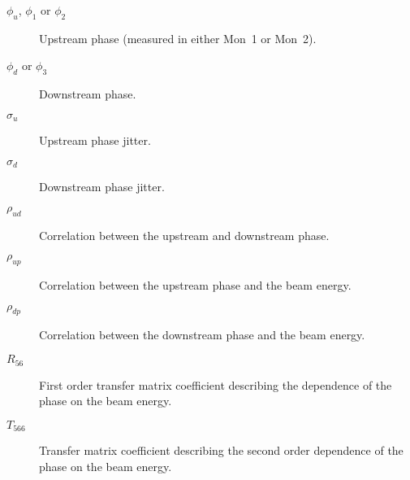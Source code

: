 \begin{description}
\item[\(\phi_{u}\), \(\phi_{1}\) or \(\phi_{2}\)] Upstream phase (measured in either Mon~1 or Mon~2).
\item[\(\phi_{d}\) or \(\phi_{3}\)] Downstream phase.
\item[\(\sigma_{u}\)] Upstream phase jitter.
\item[\(\sigma_{d}\)] Downstream phase jitter.
\item[\(\rho_{ud}\)] Correlation between the upstream and downstream phase.
\item[\(\rho_{up}\)] Correlation between the upstream phase and the beam energy.
\item[\(\rho_{dp}\)] Correlation between the downstream phase and the beam energy.
\item[\(R_{56}\)] First order transfer matrix coefficient describing the dependence of the phase on the beam energy.
\item[\(T_{566}\)] Transfer matrix coefficient describing the second order dependence of the phase on the beam energy.
\end{description}

